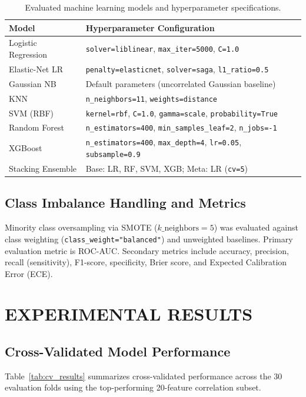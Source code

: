 \documentclass[10pt,twocolumn,a4paper]{article}
\begin{document}
\begin{table}[t]
\centering
\caption{Evaluated machine learning models and hyperparameter specifications.}
\label{tab:models}
\small
\begin{tabularx}{\columnwidth}{@{}lX@{}}
\toprule
Model & Hyperparameter Configuration \\
\midrule
Logistic Regression   & \texttt{solver=liblinear}, \texttt{max\_iter=5000}, \texttt{C=1.0} \\
Elastic-Net LR        & \texttt{penalty=elasticnet}, \texttt{solver=saga}, \texttt{l1\_ratio=0.5} \\
Gaussian NB           & Default parameters (uncorrelated Gaussian baseline) \\
KNN                   & \texttt{n\_neighbors=11}, \texttt{weights=distance} \\
SVM (RBF)             & \texttt{kernel=rbf}, \texttt{C=1.0}, \texttt{gamma=scale}, \texttt{probability=True} \\
Random Forest         & \texttt{n\_estimators=400}, \texttt{min\_samples\_leaf=2}, \texttt{n\_jobs=-1} \\
XGBoost               & \texttt{n\_estimators=400}, \texttt{max\_depth=4}, \texttt{lr=0.05}, \texttt{subsample=0.9} \\
Stacking Ensemble     & Base: LR, RF, SVM, XGB; Meta: LR (\texttt{cv=5}) \\
\bottomrule
\end{tabularx}
\end{table}

\subsection{Class Imbalance Handling and Metrics}
Minority class oversampling via SMOTE ($k\_\text{neighbors}=5$) was evaluated against class weighting (\texttt{class\_weight="balanced"})
and unweighted baselines.  Primary evaluation metric is ROC-AUC.  Secondary metrics include accuracy, precision, recall (sensitivity),
F1-score, specificity, Brier score, and Expected Calibration Error (ECE).

\section{EXPERIMENTAL RESULTS}

\subsection{Cross-Validated Model Performance}
Table~\ref{tab:cv_results} summarizes cross-validated performance across the 30 evaluation folds using the top-performing
20-feature correlation subset.
\end{document}
